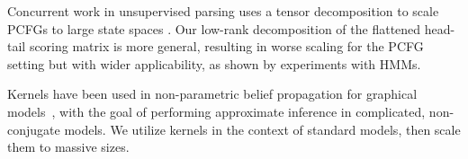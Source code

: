 \documentclass{article}
\begin{document}
Concurrent work in unsupervised parsing uses a tensor decomposition to scale PCFGs to large state spaces \citep{yang2021pcfgs}. Our low-rank decomposition of the flattened head-tail scoring matrix is more general, resulting in worse scaling for the PCFG setting but with wider applicability, as shown by experiments with HMMs.%

Kernels have been used in non-parametric belief propagation for graphical models~\citep{song2011kernelbp,song2010kernelhmm,song2011kerneltree}, with the goal of performing approximate inference in complicated, non-conjugate models.
We utilize kernels in the context of standard models, then scale them to massive sizes.





\end{document}
